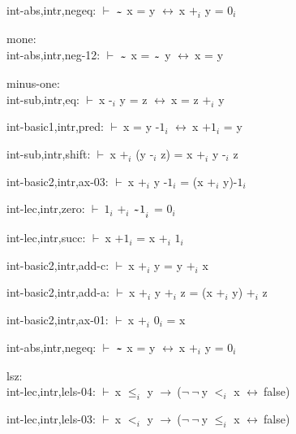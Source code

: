 \documentclass[a4paper]{article}
\newcommand{\tildesym}{\raisebox{-4pt}{\bf\~{}}}
\newcommand{\Fol}{\mbox{$\vdash\ $}}
\newcommand{\Not}{\mbox{$\neg\ $}}
\newcommand{\Imp}{\mbox{$\rightarrow\ $}}
\newcommand{\Equiv}{\mbox{$\leftrightarrow\ $}}
\begin{document}
int-abs,intr,negeq: 
 \Fol $\tildesym$ x = y \Equiv x $\mbox{+}_{i}$ y = $\mbox{0}_{i}$



\bigskip

mone:\\ int-abs,intr,neg-12: 
 \Fol $\tildesym$ x = $\tildesym$ y \Equiv x = y



\bigskip

minus-one:\\ int-sub,intr,eq: 
 \Fol x $\mbox{-}_{i}$ y = z \Equiv x = z $\mbox{+}_{i}$ y



int-basic1,intr,pred: 
 \Fol x = y $\mbox{-1}_{i}$ \Equiv x $\mbox{+1}_{i}$ = y



int-sub,intr,shift: 
 \Fol x $\mbox{+}_{i}$ (y $\mbox{-}_{i}$ z) = x $\mbox{+}_{i}$ y $\mbox{-}_{i}$ z



int-basic2,intr,ax-03: 
 \Fol x $\mbox{+}_{i}$ y $\mbox{-1}_{i}$ = (x $\mbox{+}_{i}$ y)$\mbox{-1}_{i}$



int-lec,intr,zero: 
 \Fol $\mbox{1}_{i}$ $\mbox{+}_{i}$ $\mbox{$\tildesym$1}_{i}$ = $\mbox{0}_{i}$



int-lec,intr,succ: 
 \Fol x $\mbox{+1}_{i}$ = x $\mbox{+}_{i}$ $\mbox{1}_{i}$



int-basic2,intr,add-c: 
 \Fol x $\mbox{+}_{i}$ y = y $\mbox{+}_{i}$ x



int-basic2,intr,add-a: 
 \Fol x $\mbox{+}_{i}$ y $\mbox{+}_{i}$ z = (x $\mbox{+}_{i}$ y) $\mbox{+}_{i}$ z



int-basic2,intr,ax-01: 
 \Fol x $\mbox{+}_{i}$ $\mbox{0}_{i}$ = x



int-abs,intr,negeq: 
 \Fol $\tildesym$ x = y \Equiv x $\mbox{+}_{i}$ y = $\mbox{0}_{i}$



\bigskip

lsz:\\ int-lec,intr,lels-04: 
 \Fol x $\mbox{$\le$}_{i}$ y \Imp (\Not \Not y $\mbox{$<$}_{i}$ x \Equiv false)



int-lec,intr,lels-03: 
 \Fol x $\mbox{$<$}_{i}$ y \Imp (\Not \Not y $\mbox{$\le$}_{i}$ x \Equiv false)
\end{document}
